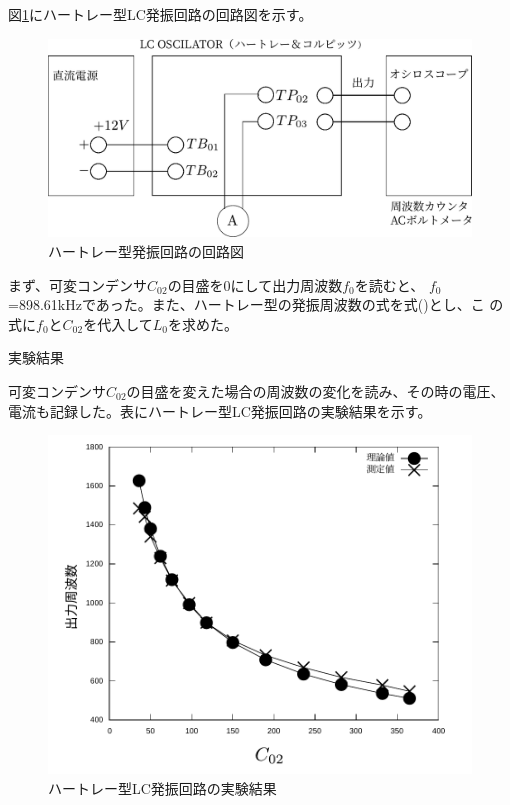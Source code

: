 \documentclass[a4paper,uplatex]{jsarticle}
\begin{document}
図\ref{experiment}にハートレー型LC発振回路の回路図を示す。

\begin{figure}[http]
	\centering
	\includegraphics[scale=0.75]{zu.pdf}
	\caption{ハートレー型発振回路の回路図}
	\label{experiment}
\end{figure}


まず、可変コンデンサ$C_{02}$の目盛を0にして出力周波数$f_0$を読むと、
$f_0$=898.61kHzであった。また、ハートレー型の発振周波数の式を式()とし、こ
の式に$f_0$と$C_{02}$を代入して$L_0$を求めた。


実験結果

可変コンデンサ$C_{02}$の目盛を変えた場合の周波数の変化を読み、その時の電圧、
電流も記録した。表にハートレー型LC発振回路の実験結果を示す。
\begin{figure}[http]
	\centering
	\includegraphics[scale=0.8]{graph.pdf}
	\caption{ハートレー型LC発振回路の実験結果}
	\label{graph}
\end{figure}
\end{document}
